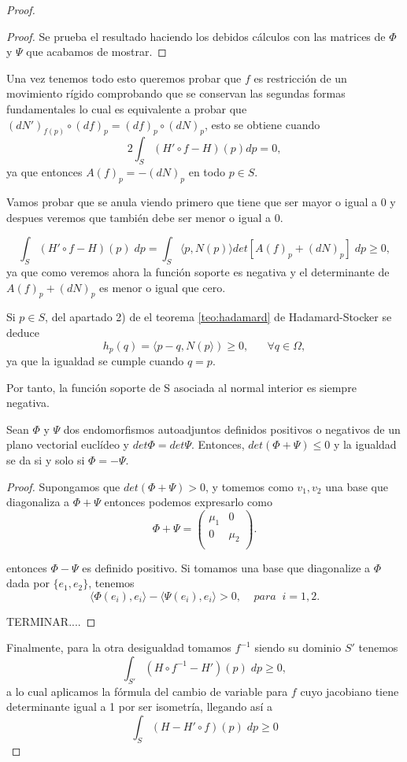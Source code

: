 \begin{proof}
\begin{proof}
		Se prueba el resultado haciendo los debidos cálculos con las matrices de $\Phi$ y $\Psi$ que acabamos de mostrar.
	\end{proof}
	
	Una vez tenemos todo esto queremos probar que $f$ es restricción de un movimiento rígido comprobando que se conservan las segundas formas fundamentales lo cual es equivalente a probar que $(dN')_{f(p)} \circ (df)_p = (df)_p \circ (dN)_p$, esto se obtiene cuando
	\[
		2\int_S (H' \circ f - H)(p) dp = 0,
	\]
	ya que entonces $A(f)_p = -(dN)_p$ en todo $p \in S$.
	
	Vamos probar que se anula viendo primero que tiene que ser mayor o igual a 0 y despues veremos que también debe ser menor o igual a 0.
	
	\[
		\int_S (H' \circ f - H)(p) \; dp = \int_S \langle p, N(p) \rangle det[A(f)_p + (dN)_p] \; dp \geq 0,
	\]
	ya que como veremos ahora la función soporte es negativa y el determinante de $A(f)_p + (dN)_p$ es menor o igual que cero.
	
	\begin{observacion}
		Si $p \in S$, del apartado 2) de el teorema \ref{teo:hadamard} de Hadamard-Stocker se deduce
		\[
			h_p (q) = \langle p - q, N(p \rangle) \geq 0, \;\;\;\;\;\; \forall q \in \Omega,
		\]
		ya que la igualdad se cumple cuando $q = p$.
		
		Por tanto, la función soporte de S asociada al normal interior es siempre negativa.
	\end{observacion}
	
	\begin{lema}
		Sean $\Phi$ y $\Psi$ dos endomorfismos autoadjuntos definidos positivos o negativos de un plano vectorial euclídeo y $det \Phi = det \Psi$. Entonces, $det (\Phi + \Psi) \leq 0$ y la igualdad se da si y solo si $\Phi = - \Psi$.
	\end{lema}
	\begin{proof}
		Supongamos que $det(\Phi + \Psi) > 0$, y tomemos como $ {v_1 , v_2} $ una base que diagonaliza a $\Phi + \Psi$ entonces podemos expresarlo como
		\[
			\Phi + \Psi = \left( {\begin{array}{cc}
									\mu_1 & 0 \\
									0 & \mu_2 \\
								\end{array} } \right).
		\]
		
		entonces $\Phi - \Psi$ es definido positivo. Si tomamos una base que diagonalize a $\Phi$ dada por $\{e_1, e_2\}$, tenemos
		\[
			\langle \Phi(e_i), e_i \rangle - \langle \Psi(e_i), e_i \rangle > 0, \;\;\;\; para \;\; i = 1,2.
		\]
		
		TERMINAR....
		
	\end{proof}
	
	Finalmente, para la otra desigualdad tomamos $f^{-1}$ siendo su dominio $S'$ tenemos
	\[
		\int_{S'} (H \circ f^{-1} - H')(p) \; dp \geq 0,
	\]
	a lo cual aplicamos la fórmula del cambio de variable para $f$ cuyo jacobiano tiene determinante igual a 1 por ser isometría, llegando así a
	\[
		\int_S (H - H' \circ f) (p) \; dp \geq 0
	\]
\end{proof}